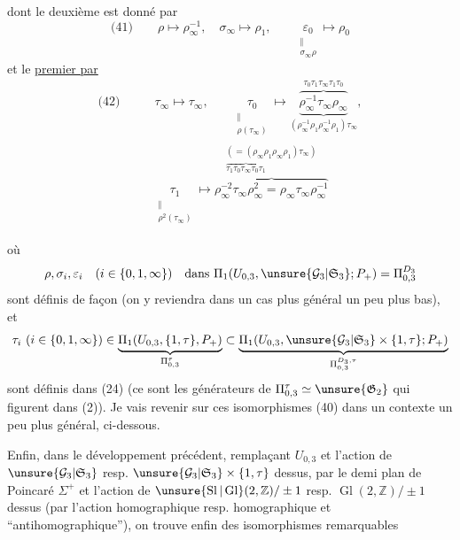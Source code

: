 dont le deuxième est donné par
\[
\text{(41)}\qquad
\boxed{\rho\longmapsto\rho_\infty^{-1},\quad\sigma_\infty\longmapsto\rho_1},
\qquad
\underset{\substack{\Vert\\\sigma_\infty\rho}}{\varepsilon_0}\longmapsto\rho_0
\]
et le \uline{premier par}
\[
\begin{aligned}
\text{(42)}\qquad
&\boxed{\tau_\infty\longmapsto\tau_\infty},\qquad
\underset{\substack{\Vert\\\rho(\tau_\infty)}}{\tau_0}
\longmapsto
\underbrace{\overbrace{\rho_\infty^{-1}\tau_\infty\rho_\infty}^{\tau_0\tau_1\tau_\infty\tau_1\tau_0}}_{(\rho_\infty^{-1}\rho_1\rho_\infty^{-1}\rho_1)\tau_\infty},\\
&
\underset{\substack{\Vert\\\rho^2(\tau_\infty)}}{\tau_1}
\longmapsto
\overbrace{\rho_\infty^{-2}\tau_\infty\rho_\infty^2
=\rho_\infty\tau_\infty\rho_\infty^{-1}}^{\substack{(=(\rho_\infty\rho_1\rho_\infty\rho_1)\tau_\infty)\\
\overbrace{\tau_1\tau_0\tau_\infty\tau_0\tau_1}}}
\end{aligned}
\]

où
\[
\rho,\sigma_i,\varepsilon_i\quad(i\in\{0,1,\infty\})
\quad\text{dans }\Pi_1(U_{0,3},\unsure{\mathcal G_3|\mathfrak S_3};P_+)=\Pi_{0,3}^{D_3}
\]
sont définis de façon  (on y reviendra dans un cas plus général un peu plus bas), et
\[
\tau_i\ (i\in\{0,1,\infty\})\in
\underbrace{\Pi_1(U_{0,3},\{1,\tau\},P_+)}_{\Pi_{0,3}^{\tau}}
\subset
\underbrace{\Pi_1(U_{0,3},\unsure{\mathcal G_3|\mathfrak S_3}\times\{1,\tau\};P_+)}_{\Pi_{0,3}^{D_3,\tau}}
\]
sont définis dans (24) (ce sont les générateurs de $\Pi_{0,3}^{\tau}\simeq\unsure{\mathfrak G_2}$ qui figurent dans (2)). Je vais revenir sur ces isomorphismes (40) dans un contexte un peu plus général, ci-dessous.

Enfin, dans le développement précédent, remplaçant $U_{0,3}$ et l'action de $\unsure{\mathcal G_3|\mathfrak S_3}$ resp. $\unsure{\mathcal G_3|\mathfrak S_3}\times\{1,\tau\}$ dessus, par  le demi plan de Poincaré $\Sigma^+$ et l'action de $\unsure{\operatorname{Sl}|\operatorname{Gl}}(2,\mathbb Z)/\pm1$ resp. $\operatorname{Gl}(2,\mathbb Z)/\pm1$ dessus (par l'action homographique resp. homographique et ``antihomographique''), on trouve enfin des isomorphismes remarquables
